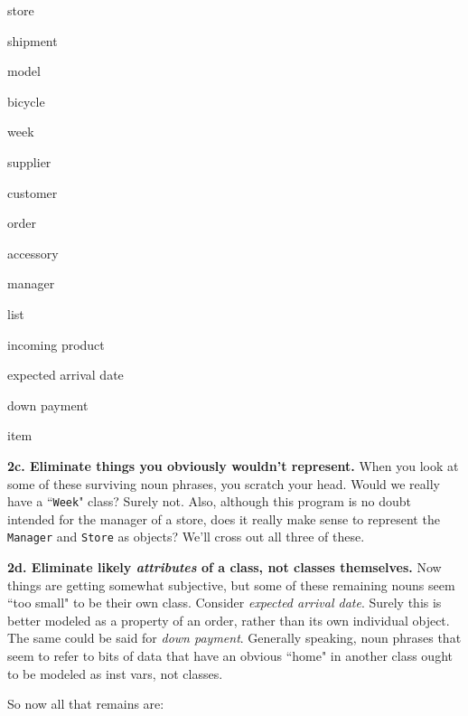 \begin{samepage}
\begin{multicols}{3}
\small
\begin{compactitem}
\item store
\item shipment
\item model
\item bicycle
\item week
\columnbreak
\item supplier
\item customer
\item order
\item accessory
\item manager
\columnbreak
\item list
\item incoming product
\item expected arrival date
\item down payment
\item item
\end{compactitem}
\end{multicols}
\end{samepage}

\vspace{.1in}

\textbf{2c. Eliminate things you obviously wouldn't represent.} When you look
at some of these surviving noun phrases, you scratch your head. Would we
really have a ``\texttt{Week}" class? Surely not. Also, although this program
is no doubt intended for the manager of a store, does it really make sense to
represent the \texttt{Manager} and \texttt{Store} as objects? We'll cross out
all three of these.

\vspace{.1in}

\textbf{2d. Eliminate likely \textit{attributes} of a class, not classes
themselves.} Now things are getting somewhat subjective, but some of these
remaining nouns seem ``too small" to be their own class. Consider
\textit{expected arrival date}. Surely this is better modeled as a property of
an order, rather than its own individual object. The same could be said for
\textit{down payment}. Generally speaking, noun phrases that seem to refer to
bits of data that have an obvious ``home" in another class ought to be modeled
as inst vars, not classes.

So now all that remains are:

